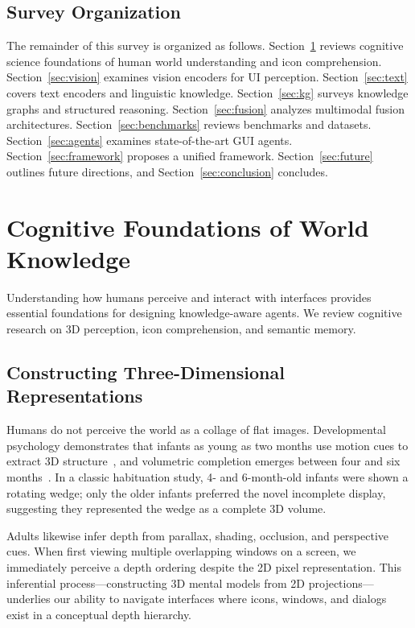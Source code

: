 \documentclass[11pt]{article}
\begin{document}
\subsection{Survey Organization}

The remainder of this survey is organized as follows. Section~\ref{sec:cognitive} reviews cognitive science foundations of human world understanding and icon comprehension. Section~\ref{sec:vision} examines vision encoders for UI perception. Section~\ref{sec:text} covers text encoders and linguistic knowledge. Section~\ref{sec:kg} surveys knowledge graphs and structured reasoning. Section~\ref{sec:fusion} analyzes multimodal fusion architectures. Section~\ref{sec:benchmarks} reviews benchmarks and datasets. Section~\ref{sec:agents} examines state-of-the-art GUI agents. Section~\ref{sec:framework} proposes a unified framework. Section~\ref{sec:future} outlines future directions, and Section~\ref{sec:conclusion} concludes.

\section{Cognitive Foundations of World Knowledge}
\label{sec:cognitive}

Understanding how humans perceive and interact with interfaces provides essential foundations for designing knowledge-aware agents. We review cognitive research on 3D perception, icon comprehension, and semantic memory.

\subsection{Constructing Three-Dimensional Representations}

Humans do not perceive the world as a collage of flat images. Developmental psychology demonstrates that infants as young as two months use motion cues to extract 3D structure~\cite{slater1985}, and volumetric completion emerges between four and six months~\cite{soska2010}. In a classic habituation study, 4- and 6-month-old infants were shown a rotating wedge; only the older infants preferred the novel incomplete display, suggesting they represented the wedge as a complete 3D volume.

Adults likewise infer depth from parallax, shading, occlusion, and perspective cues. When first viewing multiple overlapping windows on a screen, we immediately perceive a depth ordering despite the 2D pixel representation. This inferential process---constructing 3D mental models from 2D projections---underlies our ability to navigate interfaces where icons, windows, and dialogs exist in a conceptual depth hierarchy.
\end{document}
